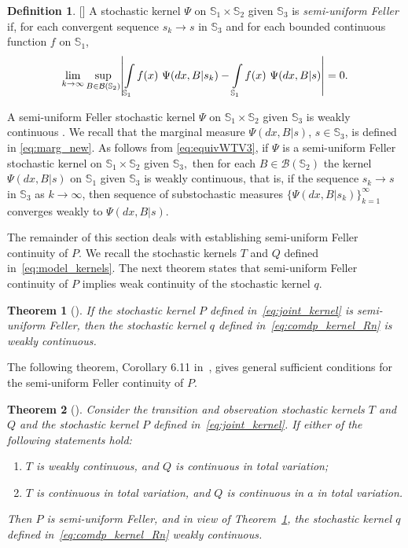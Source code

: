 \documentclass[11pt,onecolumn]{IEEEtran}  %
\newcommand{\Sb}{\mathbb{S}}
\newcommand{\Bc}{\mathcal{B}}
\DeclarePairedDelimiter{\abs}{|}{|}
\newtheorem{theorem}{Theorem}
\theoremstyle{definition}
\newtheorem{definition}{Definition}
\begin{document}
\begin{definition}\label{defi:unifFP} [{\citet{feinberg_markov_2022,JThProb}}]
    A stochastic kernel $\Psi$ on $\Sb_1\times\Sb_2$ given $\Sb_3$ is \emph{semi-uniform Feller} if, for each convergent sequence $s_k \to s$ in $\Sb_3$ and for each bounded continuous function $f$ on $\Sb_1$,
    \begin{equation}\label{eq:equivWTV3}
        \lim_{k\to\infty}
        \sup_{B\in \Bc(\Sb_2)} \abs*{
            \int\limits_{\Sb_1} f(x) \ \Psi(dx,B|s_{k})-\int\limits_{\Sb_1} f(x) \ \Psi(dx,B|s)
        } = 0.
    \end{equation}
\end{definition}
A semi-uniform Feller stochastic kernel $\Psi$ on $\Sb_1\times \Sb_2$ given $\Sb_3$ is weakly continuous \cite{feinberg_markov_2022,JThProb}. We recall that the marginal measure $\Psi(dx,B|s)$, $s\in\Sb_3$, is defined in \eqref{eq:marg_new}. As follows from \eqref{eq:equivWTV3},  if $\Psi$ is a semi-uniform Feller stochastic kernel on $\Sb_1\times\Sb_2$ given $\Sb_3,$ then for each $B\in\Bc(\Sb_2)$ the kernel $\Psi(dx,B|s)$ on $\Sb_1$ given $\Sb_3$ is weakly continuous, that is, if the sequence $s_k\to s$ in $\Sb_3$ as $k\to\infty$, then sequence of substochastic measures $\{\Psi(dx,B|s_k)\}_{k=1}^\infty$ converges weakly to $\Psi(dx,B|s)$.

The remainder of this section deals with establishing semi-uniform Feller continuity of $P$. We recall the stochastic kernels $T$ and $Q$ defined in~\eqref{eq:model_kernels}. The next theorem states that semi-uniform Feller continuity of $P$ implies weak continuity of the stochastic kernel $q$.

\begin{theorem}[{\citet[Corollary 6.7]{feinberg_markov_2022}}] \label{thm:P_implies_q}
    If the stochastic kernel $P$ defined in~\eqref{eq:joint_kernel} is semi-uniform Feller, then the stochastic kernel $q$ defined in~\eqref{eq:comdp_kernel_Rn} is weakly continuous.
\end{theorem}

The following theorem, Corollary 6.11 in~\citet{ feinberg_markov_2022}, gives general sufficient conditions for the semi-uniform Feller continuity of $P$.

\begin{theorem}[{\citet[Corollary 6.11]{feinberg_markov_2022}}] \label{thm:pomdp_to_comdp_kernel}
    Consider the transition and observation stochastic kernels $T$ and $Q$ and the stochastic kernel $P$ defined in~\eqref{eq:joint_kernel}.
    If either of the following statements hold:
    \begin{enumerate}
        \item $T$ is weakly continuous, and $Q$ is continuous in total variation;
        \item $T$ is continuous in total variation, and $Q$ is continuous in $a$ in total variation.
    \end{enumerate}
    Then $P$ is semi-uniform Feller, and in view of Theorem~\ref{thm:P_implies_q}, the stochastic kernel $q$ defined in~\eqref{eq:comdp_kernel_Rn} weakly continuous.
\end{theorem}
\end{document}
